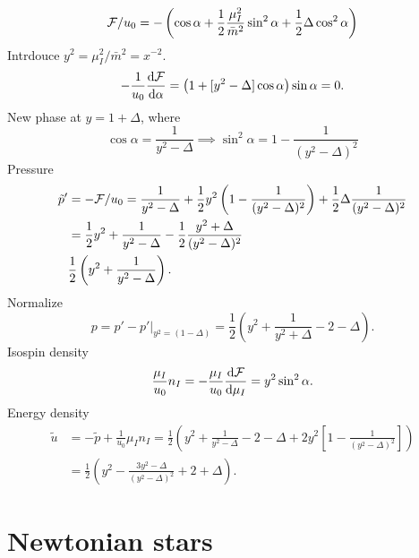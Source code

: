 \documentclass{book}
\begin{document}
\begin{equation}
    \mathcal{F} / u_0 = -
    \left( 
        \cos \alpha 
        + \frac{1}{2} \frac{\mu_I^2}{\bar m^2} \sin^2 \alpha 
        + \frac{1}{2} \Delta  \cos^2 \alpha 
    \right)
\end{equation}
Intrdouce $y^2 = \mu_I^2 / \bar m^2 = x^{-2}$. 
\begin{equation}
    -\frac{1}{u_0}\odv{\Eff}{\alpha} = 
    \left(  
        1 + [y^2 - \Delta ]\cos \alpha 
    \right) \sin \alpha = 0.
\end{equation}
New phase at $y = 1 + \Delta$, where
\begin{equation}
    \cos \alpha = \frac{1}{y^2 - \Delta} 
    \implies \sin^2 \alpha = 1 - \frac{1}{(y^2 - \Delta)^2}
\end{equation}
Pressure
\begin{align}
    \tilde p' 
    &= -\mathcal{F}/u_0 = \frac{1}{y^2 - \Delta} 
    + \frac{1}{2} y^2 \left( 1 - \frac{1}{(y^2 - \Delta)^2} \right)
    + \frac{1}{2} \Delta \frac{1}{(y^2 - \Delta)^2} \\
    & = \frac{1}{2} y^2 + \frac{1}{y^2 - \Delta}
    - \frac{1}{2} \frac{y^2 + \Delta}{(y^2 - \Delta)^2} \\
    & \frac{1}{2} \left(y^2 + \frac{1}{y^2 - \Delta}\right).
\end{align}
Normalize
\begin{equation}
    p = p' - p'|_{y^2 = (1 - \Delta)}
    = \frac{1}{2} \left( y^2 + \frac{1}{y^2 + \Delta} - 2 - \Delta \right).
\end{equation}
Isospin density
\begin{equation}
    \frac{\mu_I}{u_0} n_I = - \frac{\mu_I}{u_0} \odv{\Eff}{\mu_I}
    = y^2 \sin^2 \alpha.
\end{equation}
Energy density
\begin{align}
    \tilde u &= -\tilde p + \frac{1}{u_0} \mu_I n_I
    = \frac{1}{2} 
    \left(
        y^2 + \frac{1}{y^2 - \Delta} - 2 - \Delta + 2y^2 
        \left[1 -\frac{1}{(y^2 - \Delta)^2}\right]
    \right) \\
    & =
    \frac{1}{2}
    \left(
        y^2
        - \frac{3 y^2  - \Delta}{(y^2 - \Delta)^2}
        + 2 + \Delta 
    \right).
\end{align}


\section{Newtonian stars}
\end{document}
